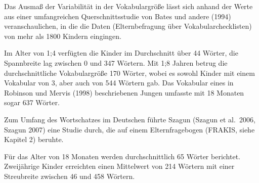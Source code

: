 \documentclass[
  letterpaper,
]{scrbook}
\begin{document}
Das Ausmaß der Variabilität in der Vokabulargröße lässt sich anhand der
Werte aus einer umfangreichen Querschnittsstudie von Bates und andere
(1994) veranschaulichen, in die die Daten (Elternbefragung über
Vokabularchecklisten) von mehr als 1800 Kindern eingingen.

\begin{tcolorbox}[enhanced jigsaw, breakable, colframe=quarto-callout-note-color-frame, bottomrule=.15mm, left=2mm, opacityback=0, colback=white, rightrule=.15mm, toprule=.15mm, leftrule=.75mm, arc=.35mm]
\begin{minipage}[t]{5.5mm}
\textcolor{quarto-callout-note-color}{\faInfo}
\end{minipage}%
\begin{minipage}[t]{\textwidth - 5.5mm}

Im Alter von 1;4 verfügten die Kinder im Durchschnitt über 44 Wörter,
die Spannbreite lag zwischen 0 und 347 Wörtern. Mit 1;8 Jahren betrug
die durchschnittliche Vokabulargröße 170 Wörter, wobei es sowohl Kinder
mit einem Vokabular von 3, aber auch von 544 Wörtern gab. Das Vokabular
eines in Robinson und Mervis (1998) beschriebenen Jungen umfasste mit 18
Monaten sogar 637 Wörter.

\end{minipage}%
\end{tcolorbox}

\begin{tcolorbox}[enhanced jigsaw, breakable, colframe=quarto-callout-note-color-frame, bottomrule=.15mm, left=2mm, opacityback=0, colback=white, rightrule=.15mm, toprule=.15mm, leftrule=.75mm, arc=.35mm]
\begin{minipage}[t]{5.5mm}
\textcolor{quarto-callout-note-color}{\faInfo}
\end{minipage}%
\begin{minipage}[t]{\textwidth - 5.5mm}

Zum Umfang des Wortschatzes im Deutschen führte Szagun (Szagun et
al.~2006, Szagun 2007) eine Studie durch, die auf einem Elternfragebogen
(FRAKIS, siehe Kapitel 2) beruhte.

Für das Alter von 18 Monaten werden durchschnittlich 65 Wörter
berichtet. Zweijährige Kinder erreichten einen Mittelwert von 214
Wörtern mit einer Streubreite zwischen 46 und 458 Wörtern.

\end{minipage}%
\end{tcolorbox}
\end{document}
